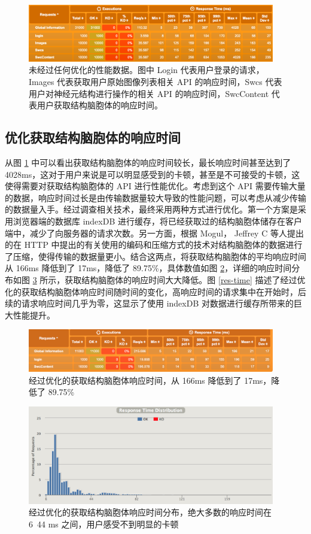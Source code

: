 \begin{figure}
\centering
\includegraphics[width=108mm]{images/origin}
\caption{未经过任何优化的性能数据。图中 Login 代表用户登录的请求， Images 代表获取用户原始图像列表相关 API 的响应时间，Swcs 代表用户对神经元结构进行操作的相关 API 的响应时间，SwcContent 代表用户获取结构脑胞体的响应时间。}
\label{origin}
\end{figure}

\subsection{优化获取结构脑胞体的响应时间}
从图 \ref{origin} 中可以看出获取结构脑胞体的响应时间较长，最长响应时间甚至达到了 4028ms，这对于用户来说是可以明显感受到的卡顿，甚至是不可接受的卡顿，这使得需要对获取结构脑胞体的 API 进行性能优化。考虑到这个 API 需要传输大量的数据，响应时间过长是由传输数据量较大导致的性能问题，可以考虑从减少传输的数据量入手。经过调查相关技术，最终采用两种方式进行优化。第一个方案是采用浏览器端的数据库 indexDB 进行缓存，将已经获取过的结构脑胞体储存在客户端中，减少了向服务器的请求次数。另一方面，根据 Mogul， Jeffrey C 等人提出的在 HTTP 中提出的有关使用的编码和压缩方式的技术对结构脑胞体的数据进行了压缩，使得传输的数据量更小。结合这两点，将获取结构脑胞体的平均响应时间从 166ms 降低到了 17ms，降低了 89.75\%，具体数值如图 \ref{swccontent}，详细的响应时间分布如图 \ref{swcdic} 所示，获取结构脑胞体的响应时间大大降低。图 \ref{res-time} 描述了经过优化的获取结构脑胞体响应时间随时间的变化，高响应时间的请求集中在开始时，后续的请求响应时间几乎为零，这显示了使用 indexDB 对数据进行缓存所带来的巨大性能提升。

\begin{figure}
\centering
\includegraphics[width=108mm]{images/swccontent}
\caption{经过优化的获取结构脑胞体响应时间，从 166ms 降低到了 17ms，降低了 89.75\%}
\label{swccontent}
\end{figure}

\begin{figure}
\centering
\includegraphics[width=108mm]{images/swcdic}
\caption{经过优化的获取结构脑胞体响应时间分布，绝大多数的响应时间在 6~44 ms 之间，用户感受不到明显的卡顿}
\label{swcdic}
\end{figure}

